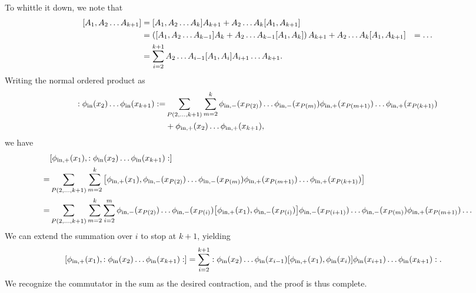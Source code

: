 To whittle it down, we note that
\begin{align*}
	\comm{A_{1}}{A_{2}\dots A_{k + 1}} &= \comm{A_{1}}{A_{2}\dots A_{k}}A_{k + 1} + A_{2}\dots A_{k}\comm{A_{1}}{A_{k + 1}} \\
	                                   &= \left(\comm{A_{1}}{A_{2}\dots A_{k - 1}}A_{k} + A_{2}\dots A_{k - 1}\comm{A_{1}}{A_{k}}\right)A_{k + 1} + A_{2}\dots A_{k}\comm{A_{1}}{A_{k + 1}}
	                                   &= \dots \\
	                                   &= \sum\limits_{i = 2}^{k + 1}A_{2}\dots A_{i - 1}\comm{A_{1}}{A_{i}}A_{i + 1}\dots A_{k + 1}.
\end{align*}
Writing the normal ordered product as
\begin{align*}
	:\phi_{\text{in}}(x_{2})\dots\phi_{\text{in}}(x_{k + 1}): =& \sum\limits_{P(2, \dots, k + 1)}\sum\limits_{m = 2}^{k}\phi_{\text{in}, -}(x_{P(2)})\dots\phi_{\text{in}, -}(x_{P(m)})\phi_{\text{in}, +}(x_{P(m + 1)})\dots\phi_{\text{in}, +}(x_{P(k + 1)}) \\
	&+ \phi_{\text{in}, +}(x_{2})\dots\phi_{\text{in}, +}(x_{k + 1}),
\end{align*}
we have
\begin{align*}
	&\comm{\phi_{\text{in}, +}(x_{1})}{\nop{\phi_{\text{in}}(x_{2})\dots\phi_{\text{in}}(x_{k + 1})}} \\
	=& \sum\limits_{P(2, \dots, k + 1)}\sum\limits_{m = 2}^{k}\comm{\phi_{\text{in}, +}(x_{1})}{\phi_{\text{in}, -}(x_{P(2)})\dots\phi_{\text{in}, -}(x_{P(m)})\phi_{\text{in}, +}(x_{P(m + 1)})\dots\phi_{\text{in}, +}(x_{P(k + 1)})} \\
	=& \sum\limits_{P(2, \dots, k + 1)}\sum\limits_{m = 2}^{k}\sum\limits_{i = 2}^{m}\phi_{\text{in}, -}(x_{P(2)})\dots\phi_{\text{in}, -}(x_{P(i)})\comm{\phi_{\text{in}, +}(x_{1})}{\phi_{\text{in}, -}(x_{P(i)})}\phi_{\text{in}, -}(x_{P(i + 1)})\dots\phi_{\text{in}, -}(x_{P(m)})\phi_{\text{in}, +}(x_{P(m + 1)})\dots
\end{align*}
We can extend the summation over $i$ to stop at $k + 1$, yielding
\begin{align*}
	\comm{\phi_{\text{in}, +}(x_{1})}{\nop{\phi_{\text{in}}(x_{2})\dots\phi_{\text{in}}(x_{k + 1})}} &= \sum\limits_{i = 2}^{k + 1}\nop{\phi_{\text{in}}(x_{2})\dots\phi_{\text{in}}(x_{i - 1})\comm{\phi_{\text{in}, +}(x_{1})}{\phi_{\text{in}}(x_{i})}\phi_{\text{in}}(x_{i + 1})\dots\phi_{\text{in}}(x_{k + 1})}.
\end{align*}
We recognize the commutator in the sum as the desired contraction, and the proof is thus complete.

